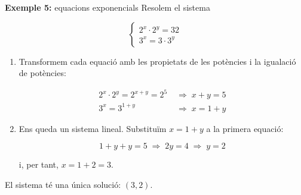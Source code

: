 \begin{exemple}{\textbf{Exemple 5:} equacions exponencials}
Resolem el sistema

\[
\begin{cases}
2^x\cdot 2^y=32\\
3^x=3\cdot 3^y
\end{cases}
\]

\begin{enumerate}
\item Transformem cada equació amb les propietats de les potències i la igualació de potències:

\[
\begin{aligned}
2^x\cdot 2^y=2^{x+y}=2^5 &\;\Rightarrow\; x+y=5\\
3^x=3^{1+y} &\;\Rightarrow\; x=1+y
\end{aligned}
\]
\item Ens queda un sistema lineal. Substituïm $x=1+y$ a la primera equació:

\[
1+y+y=5 \;\Rightarrow\; 2y=4 \;\Rightarrow\; y=2
\]

i, per tant, $x=1+2=3$.
\end{enumerate}

El sistema té una única solució: $(3,2)$.
\end{exemple}


